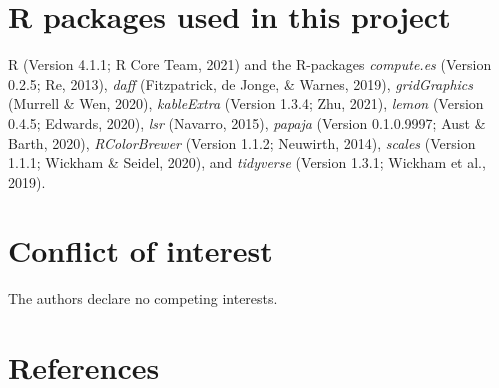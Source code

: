 \documentclass[
  english,
  man,floatsintext]{apa7}
\begin{document}
\hypertarget{r-packages-used-in-this-project}{%
\section{R packages used in this project}\label{r-packages-used-in-this-project}}

R (Version 4.1.1; R Core Team, 2021) and the R-packages \emph{compute.es} (Version 0.2.5; Re, 2013), \emph{daff} (Fitzpatrick, de Jonge, \& Warnes, 2019), \emph{gridGraphics} (Murrell \& Wen, 2020), \emph{kableExtra} (Version 1.3.4; Zhu, 2021), \emph{lemon} (Version 0.4.5; Edwards, 2020), \emph{lsr} (Navarro, 2015), \emph{papaja} (Version 0.1.0.9997; Aust \& Barth, 2020), \emph{RColorBrewer} (Version 1.1.2; Neuwirth, 2014), \emph{scales} (Version 1.1.1; Wickham \& Seidel, 2020), and \emph{tidyverse} (Version 1.3.1; Wickham et al., 2019).

\hypertarget{conflict-of-interest}{%
\section{Conflict of interest}\label{conflict-of-interest}}

The authors declare no competing interests.

\hypertarget{references}{%
\section{References}\label{references}}

\begingroup
\setlength{\parindent}{-0.5in}
\setlength{\leftskip}{0.5in}

\endgroup
\end{document}
